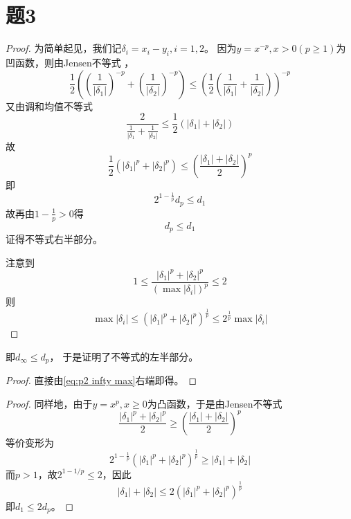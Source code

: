 \documentclass[cn]{homework}
\begin{document}
    \section{题3}
    \begin{subproblem}
        \item
        \begin{proof}
        为简单起见，我们记$\delta_i=x_i-y_i,i=1,2$。
        因为$y=x^{-p},x>0(p\geq 1)$为凹函数，则由Jensen不等式
        ，
        \begin{equation*}
            \frac{1}{2}\left(
                \left(\frac{1}{|\delta_1|}\right)^{-p}
                +\left(\frac{1}{|\delta_2|}\right)^{-p}
            \right)
            \leq\left(\frac{1}{2}\left(
                \frac{1}{|\delta_1|}
                +\frac{1}{|\delta_2|}
            \right)\right)^{-p}
        \end{equation*}
        又由调和均值不等式
        \[\frac{2}{\frac{1}{|\delta_1}+\frac{1}{|\delta_2|}}
        \leq\frac{1}{2}(|\delta_1|+|\delta_2|)\]
        故
        \[\frac{1}{2}(|\delta_1|^p+|\delta_2|^p)
        \leq\left(\frac{|\delta_1|+|\delta_2|}{2}\right)^p\]
        即
        \[2^{1-\frac{1}{p}}d_p\leq d_1\]
        故再由$1-\frac{1}{p}>0$得
        \[d_p\leq d_1\]
        证得不等式右半部分。

        注意到
        \[
            1\leq\frac{|\delta_1|^p+|\delta_2|^p}{\left(\max|\delta_i|\right)^p}\leq 2
        \]
        则
        \begin{equation}
            \label{eq:p2 infty max}
            \max|\delta_i|\leq\left(|\delta_1|^p+|\delta_2|^p\right)^\frac 1 p
            \leq 2^\frac 1 p\max|\delta_i|
        \end{equation}
        \end{proof}
        即$d_\infty\leq d_p$，
        于是证明了不等式的左半部分。

        \item
        \begin{proof}
        直接由\cref{eq:p2 infty max}右端即得。
        \end{proof}

        \item
        \begin{proof}
        同样地，由于$y=x^p,x\geq 0$为凸函数，于是由Jensen不等式
        \begin{equation*}
            \label{eq:p2 Jensen}
            \frac{|\delta_1|^p+|\delta_2|^p}{2}
            \geq\left(\frac{|\delta_1|+|\delta_2|}{2}\right)^p
        \end{equation*}
        等价变形为
        \[2^{1-\frac{1}{p}}(|\delta_1|^p+|\delta_2|^p)^\frac{1}{p}
        \geq |\delta_1|+|\delta_2|\]
        而$p>1$，故$2^{1-1/p}\leq 2$，因此
        \[|\delta_1|+|\delta_2|\leq 2(|\delta_1|^p+|\delta_2|^p)^\frac{1}{p}\]
        即$d_1\leq 2d_p$。
        \end{proof}
    \end{subproblem}
\end{document}

